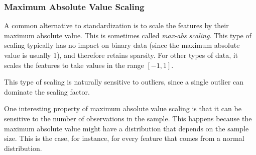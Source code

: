 \subsubsection{Maximum Absolute Value Scaling}

A common alternative to standardization is to scale the features by their maximum absolute value. This is sometimes called \emph{max-abs scaling}. This type of scaling typically has no impact on binary data (since the maximum absolute value is usually 1), and therefore retains sparsity. For other types of data, it scales the features to take values in the range \([-1, 1]\).

This type of scaling is naturally sensitive to outliers, since a single outlier can dominate the scaling factor.

One interesting property of maximum absolute value scaling is that it can be sensitive to the number of observations in the sample. This happens because the maximum absolute value might have a distribution that depends on the sample size. This is the case, for instance, for every feature that comes from a normal distribution.

